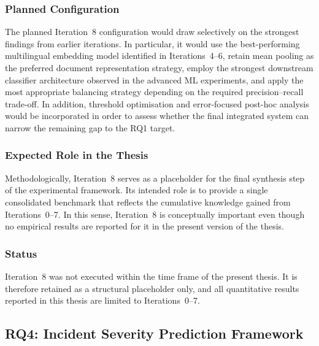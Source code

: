 \documentclass[11pt, titlepage, bibliography=totoc]{scrreprt}
\begin{document}
\subsubsection{Planned Configuration}
The planned Iteration~8 configuration would draw selectively on the strongest findings from earlier iterations. In particular, it would use the best-performing multilingual embedding model identified in Iterations~4--6, retain mean pooling as the preferred document representation strategy, employ the strongest downstream classifier architecture observed in the advanced ML experiments, and apply the most appropriate balancing strategy depending on the required precision--recall trade-off. In addition, threshold optimisation and error-focused post-hoc analysis would be incorporated in order to assess whether the final integrated system can narrow the remaining gap to the RQ1 target.

\subsubsection{Expected Role in the Thesis}
Methodologically, Iteration~8 serves as a placeholder for the final synthesis step of the experimental framework. Its intended role is to provide a single consolidated benchmark that reflects the cumulative knowledge gained from Iterations~0--7. In this sense, Iteration~8 is conceptually important even though no empirical results are reported for it in the present version of the thesis.

\subsubsection{Status}
Iteration~8 was not executed within the time frame of the present thesis. It is therefore retained as a structural placeholder only, and all quantitative results reported in this thesis are limited to Iterations~0--7.


\subsection{RQ4: Incident Severity Prediction Framework}
\label{sec:rq4_methodology}
\end{document}
